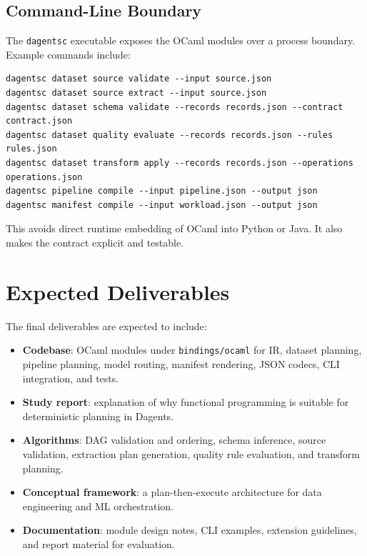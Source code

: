 \documentclass[conference]{IEEEtran}
\begin{document}
\subsection{Command-Line Boundary}

The \texttt{dagentsc} executable exposes the OCaml modules over a process
boundary. Example commands include:

\begin{lstlisting}[style=ocamlstyle]
dagentsc dataset source validate --input source.json
dagentsc dataset source extract --input source.json
dagentsc dataset schema validate --records records.json --contract contract.json
dagentsc dataset quality evaluate --records records.json --rules rules.json
dagentsc dataset transform apply --records records.json --operations operations.json
dagentsc pipeline compile --input pipeline.json --output json
dagentsc manifest compile --input workload.json --output json
\end{lstlisting}

This avoids direct runtime embedding of OCaml into Python or Java. It also makes
the contract explicit and testable.

\section{Expected Deliverables}

The final deliverables are expected to include:

\begin{itemize}
  \item \textbf{Codebase}: OCaml modules under \texttt{bindings/ocaml} for IR,
  dataset planning, pipeline planning, model routing, manifest rendering, JSON
  codecs, CLI integration, and tests.
  \item \textbf{Study report}: explanation of why functional programming is
  suitable for deterministic planning in Dagents.
  \item \textbf{Algorithms}: DAG validation and ordering, schema inference,
  source validation, extraction plan generation, quality rule evaluation, and
  transform planning.
  \item \textbf{Conceptual framework}: a plan-then-execute architecture for
  data engineering and ML orchestration.
  \item \textbf{Documentation}: module design notes, CLI examples, extension
  guidelines, and report material for evaluation.
\end{itemize}
\end{document}
